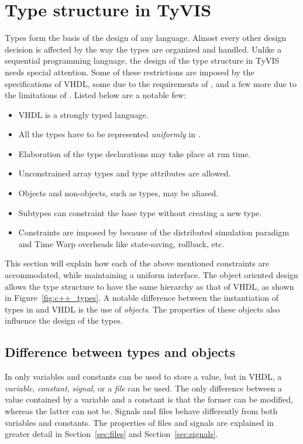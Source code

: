 \documentclass[11pt]{article}
\begin{document}
\section{Type structure in TyVIS}
\label{chp:design_types}

Types form the basis of the design of any language.  Almost every
other design decision is affected by the way the types are organized
and handled.  Unlike a sequential programming language, the design of
the type structure in TyVIS needs special attention.  Some of these
restrictions are imposed by the specifications of VHDL, some due to
the requirements of \warped, and a few more due to the limitations of
\Cpp\/.  Listed below are a notable few:

\begin{itemize}
  \setlength{\itemsep}{-5pt}
\item VHDL is a strongly typed language.
\item All the types have to be represented \textit{uniformly} in \Cpp.
\item Elaboration of the type declarations may take place at run time.
\item Unconstrained array types and type attributes are allowed.
\item Objects and non-objects, such as types, may be aliased.
\item Subtypes can constraint the base type without creating a new type.
\item Constraints are imposed by \warped\/ because of the distributed
  simulation paradigm and Time Warp overheads like state-saving,
  rollback, etc.
\end{itemize}

This section will explain how each of the above mentioned constraints
are accommodated, while maintaining a uniform interface.  The object
oriented design allows the \Cpp\/ type structure to have the same
hierarchy as that of VHDL, as shown in Figure~\ref{fig:c++_types}.  A
notable difference between the instantiation of types in \Cpp\/ and VHDL
is the use of \textit{objects}.  The properties of these objects also
influence the design of the types.

\subsection{Difference between types and objects}

In \Cpp\/ only variables and constants can be used to store a value,
but in VHDL, a \textit{variable}, \textit{constant}, \textit{signal},
or a \textit{file} can be used.  The only difference between a value
contained by a variable and a constant is that the former can be
modified, whereas the latter can not be.  Signals and files behave
differently from both variables and constants. The properties of files
and signals are explained in greater detail in Section~\ref{sec:files}
and Section~\ref{sec:signals}.
\end{document}
